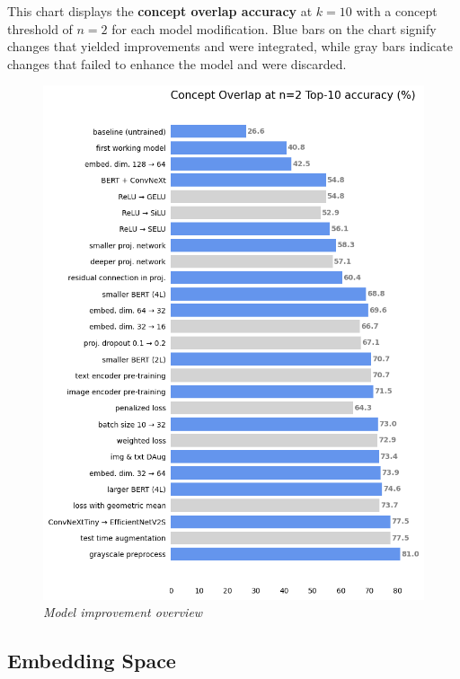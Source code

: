 \documentclass[10pt,twocolumn,letterpaper]{article}
\begin{document}
This chart displays the \textbf{concept overlap accuracy} at $k=10$ with a concept threshold of $n=2$ for each model modification.
Blue bars on the chart signify changes that yielded improvements and were integrated, while gray bars indicate changes that failed to enhance the model and were discarded.

\begin{figure}
   \centering
   \includegraphics[width=0.8\linewidth]{img/Improvement_Plot.png}
   \caption{\textit{Model improvement overview}}
   \label{fig:imprp}
\end{figure}

\subsection{Embedding Space}
\end{document}
